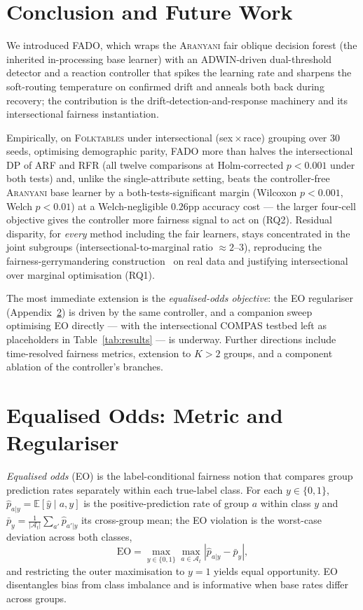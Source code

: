 \documentclass[sigconf,anonymous,review]{acmart}
\begin{document}
\section{Conclusion and Future Work}
\label{sec:conclusion}
We introduced \textsc{FADO}, which wraps the \textsc{Aranyani} fair oblique decision forest (the inherited in-processing base learner) with an ADWIN-driven
dual-threshold detector and a reaction controller that spikes the learning rate and sharpens the soft-routing temperature on confirmed drift and anneals both back
during recovery; the contribution is the drift-detection-and-response machinery and its intersectional fairness instantiation.

Empirically, on \textsc{Folktables} under intersectional (sex\,$\times$\,race) grouping over $30$ seeds, optimising demographic parity, \textsc{FADO} more than halves
the intersectional DP of \textsc{ARF} and \textsc{RFR} (all twelve comparisons at Holm-corrected $p<0.001$ under both tests) and, unlike the single-attribute setting,
beats the controller-free \textsc{Aranyani} base learner by a both-tests-significant margin (Wilcoxon $p<0.001$, Welch $p<0.01$) at a Welch-negligible $0.26$pp accuracy
cost --- the larger four-cell objective gives the controller more fairness signal to act on (RQ2). Residual disparity, for \emph{every} method including the fair
learners, stays concentrated in the joint subgroups (intersectional-to-marginal ratio $\approx\!2$--$3$), reproducing the fairness-gerrymandering
construction~\cite{kearns2018gerrymandering} on real data and justifying intersectional over marginal optimisation (RQ1).

The most immediate extension is the \emph{equalised-odds objective}: the EO regulariser (Appendix~\ref{app:eo}) is driven by the same controller, and a companion sweep
optimising EO directly --- with the intersectional \textsc{COMPAS} testbed left as placeholders in Table~\ref{tab:results} --- is underway. Further directions include
time-resolved fairness metrics, extension to $K>2$ groups, and a component ablation of the controller's branches.

\newpage



\appendix

\section{Equalised Odds: Metric and Regulariser}
\label{app:eo}
\emph{Equalised odds} (EO) is the label-conditional fairness notion that compares group prediction rates separately within each true-label class. For each $y \in \{0,1\}$,
$\hat{p}_{a|y} = \mathbb{E}[\hat{y} \mid a, y]$ is the positive-prediction rate of group $a$ within class $y$ and $\bar{p}_y = \frac{1}{|\mathcal{A}_t|}\sum_{a'}\hat{p}_{a'|y}$ its
cross-group mean; the EO violation is the worst-case deviation across both classes,
\[
\mathrm{EO} = \max_{y \in \{0,1\}} \max_{a \in \mathcal{A}_t}\left|\hat{p}_{a|y} - \bar{p}_y\right|,
\]
and restricting the outer maximisation to $y{=}1$ yields equal opportunity. EO disentangles bias from class imbalance and is informative when base rates differ across groups.
\end{document}
